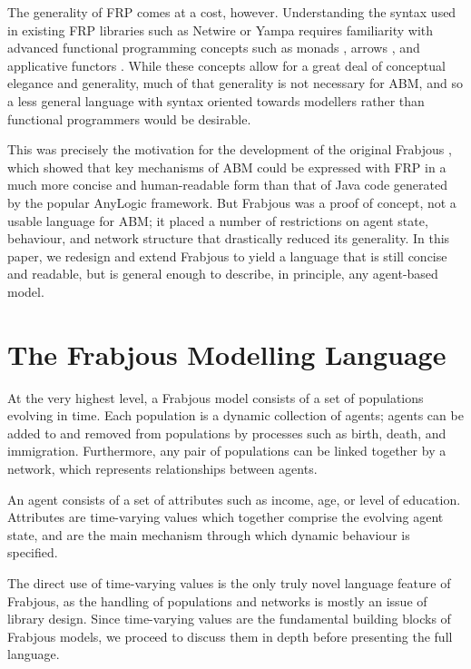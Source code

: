 \documentclass{llncs}
\begin{document}
  The generality of FRP comes at a cost, however. Understanding the syntax used in existing FRP libraries such as Netwire or Yampa \cite{yampa} requires familiarity with advanced functional programming concepts such as monads \cite{monads}, arrows \cite{mon2arr}, and applicative functors \cite{applicative}. While these concepts allow for a great deal of conceptual elegance and generality, much of that generality is not necessary for ABM, and so a less general language with syntax oriented towards modellers rather than functional programmers would be desirable.
  
  This was precisely the motivation for the development of the original Frabjous \cite{frabjous}, which showed that key mechanisms of ABM could be expressed with FRP in a much more concise and human-readable form than that of Java code generated by the popular AnyLogic framework. But Frabjous was a proof of concept, not a usable language for ABM; it placed a number of restrictions on agent state, behaviour, and network structure that drastically reduced its generality. In this paper, we redesign and extend Frabjous to yield a language that is still concise and readable, but is general enough to describe, in principle, any agent-based model.
  
  
\section{The Frabjous Modelling Language}

At the very highest level, a Frabjous model consists of a set of populations evolving in time. Each population is a dynamic collection of agents; agents can be added to and removed from populations by processes such as birth, death, and immigration. Furthermore, any pair of populations can be linked together by a network, which represents relationships between agents.

An agent consists of a set of attributes such as income, age, or level of education. Attributes are time-varying values which together comprise the evolving agent state, and are the main mechanism through which dynamic behaviour is specified. 

The direct use of time-varying values is the only truly novel language feature of Frabjous, as the handling of populations and networks is mostly an issue of library design. Since time-varying values are the fundamental building blocks of Frabjous models, we proceed to discuss them in depth before presenting the full language. 
\end{document}
